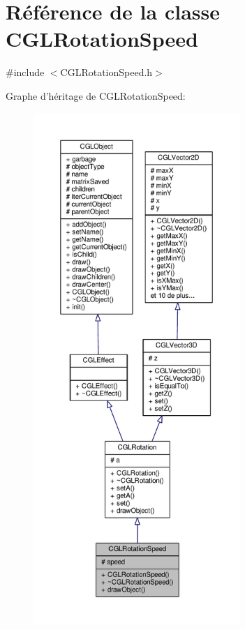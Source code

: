 \hypertarget{class_c_g_l_rotation_speed}{\section{Référence de la classe C\-G\-L\-Rotation\-Speed}
\label{class_c_g_l_rotation_speed}
}


{\ttfamily \#include $<$C\-G\-L\-Rotation\-Speed.\-h$>$}



Graphe d'héritage de C\-G\-L\-Rotation\-Speed\-:
\nopagebreak
\begin{figure}[H]
\begin{center}
\leavevmode
\includegraphics[height=550pt]{d0/dbb/class_c_g_l_rotation_speed__inherit__graph}
\end{center}
\end{figure}


